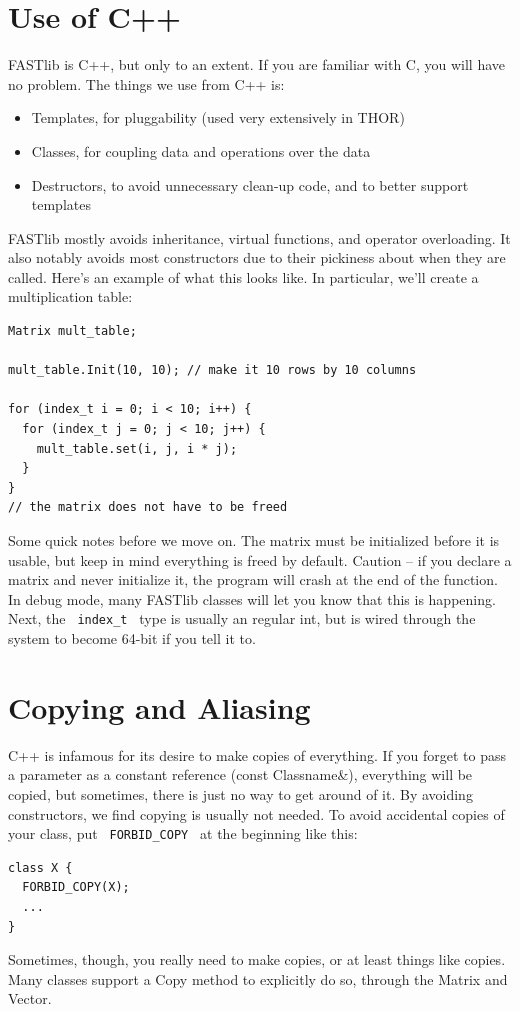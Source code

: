 \documentclass[letter]{report}
\begin{document}
\section{Use of C++}

FASTlib is C++, but only to an extent. If you are familiar with C, you will have no problem. The things we use from C++ is:
\begin{itemize}
\item Templates, for pluggability (used very extensively in THOR)
\item Classes, for coupling data and operations over the data
\item Destructors, to avoid unnecessary clean-up code, and to better support templates 
\end{itemize}
FASTlib mostly avoids inheritance, virtual functions, and operator overloading. It also notably avoids most constructors due to their pickiness about when they are called. Here's an example of what this looks like. In particular, we'll create a multiplication table:
\begin{verbatim}
Matrix mult_table;

mult_table.Init(10, 10); // make it 10 rows by 10 columns

for (index_t i = 0; i < 10; i++) {
  for (index_t j = 0; j < 10; j++) {
    mult_table.set(i, j, i * j);
  }
}
// the matrix does not have to be freed
\end{verbatim}
Some quick notes before we move on. The matrix must be initialized before it is usable, but keep in mind everything is freed by default. Caution -- if you declare a matrix and never initialize it, the program will crash at the end of the function. In debug mode, many FASTlib classes will let you know that this is happening. Next, the \verb= index_t = type is usually an regular int, but is wired through the system to become 64-bit if you tell it to.

\section{Copying and Aliasing}

C++ is infamous for its desire to make copies of everything. If you forget to pass a parameter as a constant reference (const Classname\&), everything will be copied, but sometimes, there is just no way to get around of it. By avoiding constructors, we find copying is usually not needed. To avoid accidental copies of your class, put \verb= FORBID_COPY = at the beginning like this:
\begin{verbatim}
class X {
  FORBID_COPY(X);
  ...
}
\end{verbatim}
Sometimes, though, you really need to make copies, or at least things like copies. Many classes support a Copy method to explicitly do so, through the Matrix and Vector.
\end{document}
